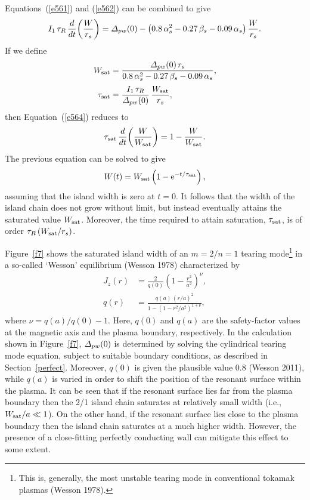 \documentclass[notitlepage,12pt]{article}
\begin{document}
Equations~(\ref{e561}) and (\ref{e562}) can be combined to give
\begin{equation}\label{e564}
I_1\,\tau_R\,\frac{d}{dt}\!\left(\frac{W}{r_s}\right)= {\mit\Delta}_{pw}(0)- \left(0.8\,\alpha_s^{2}-0.27\,\beta_s - 0.09\,\alpha_s\right)\frac{W}{r_s}.
\end{equation}
If we define
\begin{align}
W_{\rm sat} &= \frac{{\mit\Delta}_{pw}(0)\,r_s}{0.8\,\alpha_s^{2}-0.27\,\beta_s - 0.09\,\alpha_s},\\[0.5ex]
\tau_{\rm sat} &= \frac{I_1\,\tau_R}{{\mit\Delta}_{pw}(0)}\,\frac{W_{\rm sat}}{r_s},
\end{align}
then Equation~(\ref{e564}) reduces to
\begin{equation}
\tau_{\rm sat} \,\frac{d}{dt}\!\left(\frac{W}{W_{\rm sat}}\right) = 1-\frac{W}{W_{\rm sat}}.
\end{equation}
The previous equation can be solved to give
\begin{equation}
W(t) = W_{\rm sat}\left(1-{\rm e}^{-t/\tau_{\rm sat}}\right),
\end{equation}
assuming that the island width is zero at $t=0$. It follows that the width of the island chain does not grow without limit, 
but instead eventually attains the saturated 
value $W_{\rm sat}$. Moreover, the time required to attain saturation, $\tau_{\rm sat}$, is of order $\tau_R\,(W_{\rm sat}/r_s)$. 

Figure~\ref{f7} shows the saturated island width of an $m=2/n=1$ tearing mode\footnote{This is, generally, the most unstable tearing mode in conventional tokamak plasmas (Wesson 1978).}  in a so-called `Wesson' equilibrium (Wesson 1978) characterized by 
\begin{align}
J_z(r) &= \frac{2}{q(0)}\left(1-\frac{r^2}{a^2}\right)^\nu,\\[0.5ex]
q(r) &= \frac{q(a)\,(r/a)^2}{1-(1-r^2/a^2)^{1+\nu}},
\end{align}
where $\nu = q(a)/q(0)-1$.  Here, $q(0)$ and $q(a)$ are the safety-factor values at the magnetic axis and the plasma
boundary, respectively. In the calculation shown in Figure~\ref{f7}, ${\mit\Delta}_{pw}(0)$ is determined by solving the cylindrical tearing mode
equation, subject to suitable boundary conditions, as described in Section~\ref{perfect}.  Moreover, $q(0)$ is given the plausible value 0.8 (Wesson 2011), while
$q(a)$ is varied in order to shift the position of the resonant surface within the plasma. It can be seen that if the resonant
surface lies far from the plasma boundary then the 2/1 island chain saturates at relatively small width (i.e., $W_{\rm sat}/a\ll 1$). 
On the other hand, if the resonant surface lies close to the plasma boundary then the island chain
saturates at a much higher width. However, the presence of a close-fitting perfectly conducting wall can mitigate this
effect to some extent. 
\end{document}
